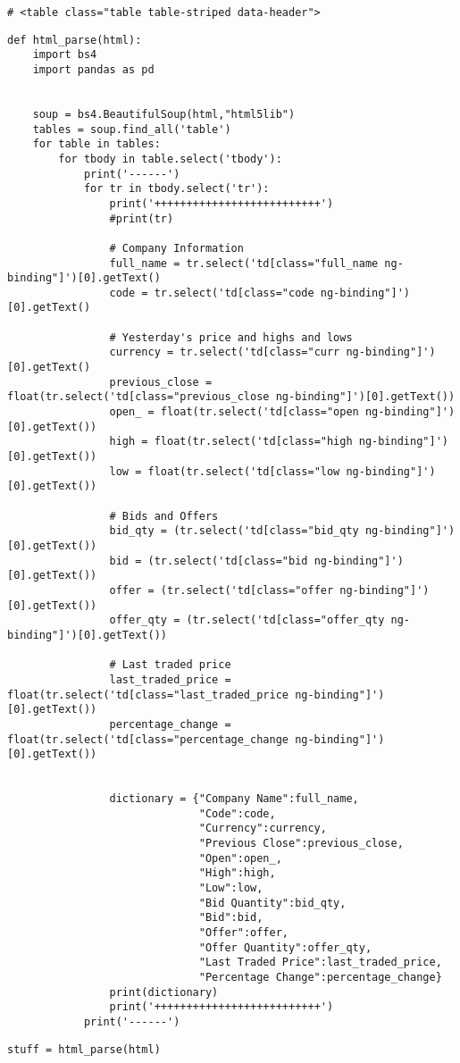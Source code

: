 \documentclass[11pt]{article}
\begin{document}
\begin{verbatim}
# <table class="table table-striped data-header">
\end{verbatim}

\begin{verbatim}
def html_parse(html):
    import bs4
    import pandas as pd


    soup = bs4.BeautifulSoup(html,"html5lib")
    tables = soup.find_all('table')
    for table in tables:
        for tbody in table.select('tbody'):
            print('------')
            for tr in tbody.select('tr'):
                print('++++++++++++++++++++++++++')
                #print(tr)

                # Company Information
                full_name = tr.select('td[class="full_name ng-binding"]')[0].getText()
                code = tr.select('td[class="code ng-binding"]')[0].getText()

                # Yesterday's price and highs and lows
                currency = tr.select('td[class="curr ng-binding"]')[0].getText()
                previous_close = float(tr.select('td[class="previous_close ng-binding"]')[0].getText())
                open_ = float(tr.select('td[class="open ng-binding"]')[0].getText())
                high = float(tr.select('td[class="high ng-binding"]')[0].getText())
                low = float(tr.select('td[class="low ng-binding"]')[0].getText())

                # Bids and Offers
                bid_qty = (tr.select('td[class="bid_qty ng-binding"]')[0].getText())
                bid = (tr.select('td[class="bid ng-binding"]')[0].getText())
                offer = (tr.select('td[class="offer ng-binding"]')[0].getText())
                offer_qty = (tr.select('td[class="offer_qty ng-binding"]')[0].getText())

                # Last traded price
                last_traded_price = float(tr.select('td[class="last_traded_price ng-binding"]')[0].getText())
                percentage_change = float(tr.select('td[class="percentage_change ng-binding"]')[0].getText())


                dictionary = {"Company Name":full_name,
                              "Code":code,
                              "Currency":currency,
                              "Previous Close":previous_close,
                              "Open":open_,
                              "High":high,
                              "Low":low,
                              "Bid Quantity":bid_qty,
                              "Bid":bid,
                              "Offer":offer,
                              "Offer Quantity":offer_qty,
                              "Last Traded Price":last_traded_price,
                              "Percentage Change":percentage_change}
                print(dictionary)
                print('++++++++++++++++++++++++++')
            print('------')
\end{verbatim}

\begin{verbatim}
stuff = html_parse(html)
\end{verbatim}
\end{document}
